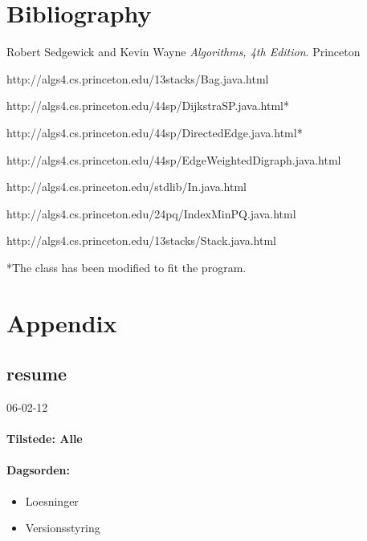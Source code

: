\documentclass[a4paper,10pt,titlepage]{article}
\begin{document}
	\section{Bibliography}
	
	\begin{thebibliography}{9}
  	Robert Sedgewick and Kevin Wayne
  	\emph{Algorithms, 4th Edition}.
  	Princeton

	http://algs4.cs.princeton.edu/13stacks/Bag.java.html
	
	http://algs4.cs.princeton.edu/44sp/DijkstraSP.java.html*  	
	
	http://algs4.cs.princeton.edu/44sp/DirectedEdge.java.html*
	
	http://algs4.cs.princeton.edu/44sp/EdgeWeightedDigraph.java.html
  	
	http://algs4.cs.princeton.edu/stdlib/In.java.html
	
	http://algs4.cs.princeton.edu/24pq/IndexMinPQ.java.html
	
	 												http://algs4.cs.princeton.edu/13stacks/Stack.java.html
	
	\end{thebibliography}
	*The class has been modified to fit the program.	
		
	\section{Appendix}
		\subsection{resume}
		
		\begin{center}
		06-02-12
		\end{center}
				\paragraph{Tilstede: Alle}
				\paragraph{Dagsorden:}
				\begin{itemize}
					\item Loesninger
					\item Versionsstyring
				\end{itemize}
				
\end{document}
